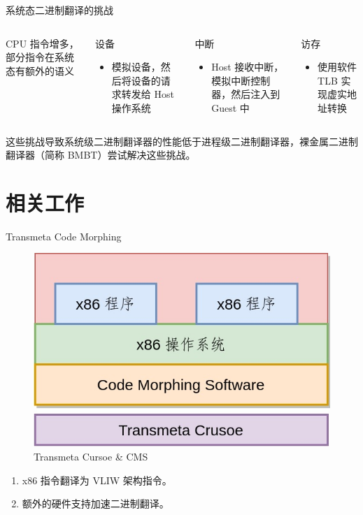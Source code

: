 \documentclass{beamer}
\begin{document}
\begin{frame}{系统态二进制翻译的挑战}
	\begin{columns}[T,onlytextwidth]
		\begin{block}{CPU}
			指令增多，部分指令在系统态有额外的语义
		\end{block}

		\begin{alertblock}{设备}
			\begin{itemize}
				\item 模拟设备，然后将设备的请求转发给 Host 操作系统
			\end{itemize}
		\end{alertblock}

		\begin{alertblock}{中断}
			\begin{itemize}
				\item Host 接收中断，模拟中断控制器，然后注入到 Guest 中
			\end{itemize}
		\end{alertblock}

		\begin{alertblock}{访存}
			\begin{itemize}
				\item 使用软件 TLB 实现虚实地址转换
			\end{itemize}
		\end{alertblock}
	\end{columns}
	这些挑战导致系统级二进制翻译器的性能低于进程级二进制翻译器，裸金属二进制翻译器（简称 BMBT）尝试解决这些挑战。
\end{frame}

\section{相关工作}

\begin{frame}{Transmeta Code Morphing}
	\begin{figure}
		\includegraphics[width=0.4\linewidth]{../paper/images/transmeta.jpg}
		\caption{Transmeta Cursoe \& CMS }
	\end{figure}
	\begin{enumerate}
		\item x86 指令翻译为 VLIW 架构指令。
		\item 额外的硬件支持加速二进制翻译。
	\end{enumerate}
\end{frame}
\end{document}
